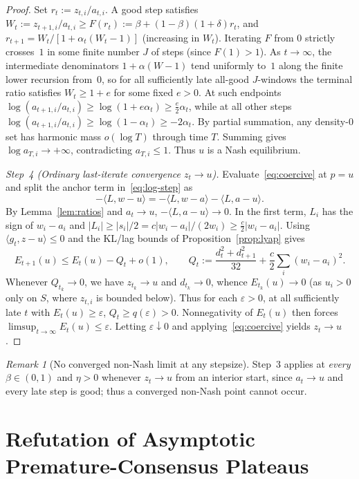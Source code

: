 \documentclass[11pt]{article}
\theoremstyle{plain}
\theoremstyle{definition}
\theoremstyle{remark}
\newtheorem{remark}{Remark}
\begin{document}
\begin{proof}
Set $r_t := z_{t,i}/a_{t,i}$. A good step satisfies $W_t := z_{t+1,i}/a_{t,i} \ge F(r_t) := \beta + (1-\beta)(1+\delta)r_t$, and $r_{t+1} = W_t/[1 + \alpha_t(W_t - 1)]$ (increasing in $W_t$). Iterating $F$ from $0$ strictly crosses~$1$ in some finite number $J$ of steps (since $F(1) > 1$). As $t \to \infty$, the intermediate denominators $1 + \alpha(W-1)$ tend uniformly to~$1$ along the finite lower recursion from~$0$, so for all sufficiently late all-good $J$-windows the terminal ratio satisfies $W_t \ge 1 + e$ for some fixed $e > 0$. At such endpoints $\log(a_{t+1,i}/a_{t,i}) \ge \log(1 + e\alpha_t) \ge \frac{e}{2}\alpha_t$, while at all other steps $\log(a_{t+1,i}/a_{t,i}) \ge \log(1 - \alpha_t) \ge -2\alpha_t$. By partial summation, any density-$0$ set has harmonic mass $o(\log T)$ through time $T$. Summing gives $\log a_{T,i} \to +\infty$, contradicting $a_{T,i} \le 1$. Thus $u$ is a Nash equilibrium.

\emph{Step~4 (Ordinary last-iterate convergence $z_t \to u$).}
Evaluate~\eqref{eq:coercive} at $p = u$ and split the anchor term in~\eqref{eq:log-step} as
\[
-\langle L, w - u \rangle = -\langle L, w - a \rangle - \langle L, a - u \rangle.
\]
By Lemma~\ref{lem:ratios} and $a_t \to u$, $-\langle L, a - u\rangle \to 0$. In the first term, $L_i$ has the sign of $w_i - a_i$ and $|L_i| \ge |s_i|/2 = c|w_i - a_i|/(2w_i) \ge \frac{c}{2}|w_i - a_i|$. Using $\langle g_t, z - u\rangle \le 0$ and the KL/lag bounds of Proposition~\ref{prop:lyap} gives
\[
E_{t+1}(u) \le E_t(u) - Q_t + o(1), \qquad Q_t := \frac{d_t^2 + d_{t+1}^2}{32} + \frac{c}{2}\sum_i (w_i - a_i)^2.
\]
Whenever $Q_{t_k} \to 0$, we have $z_{t_k} \to u$ and $d_{t_k} \to 0$, whence $E_{t_k}(u) \to 0$ (as $u_i > 0$ only on $S$, where $z_{t,i}$ is bounded below). Thus for each $\varepsilon > 0$, at all sufficiently late $t$ with $E_t(u) \ge \varepsilon$, $Q_t \ge q(\varepsilon) > 0$. Nonnegativity of $E_t(u)$ then forces $\limsup_{t \to \infty} E_t(u) \le \varepsilon$. Letting $\varepsilon \downarrow 0$ and applying~\eqref{eq:coercive} yields $z_t \to u$.
\end{proof}

\begin{remark}[No converged non-Nash limit at any stepsize]
Step~3 applies at \emph{every} $\beta \in (0, 1)$ and $\eta > 0$ whenever $z_t \to u$ from an interior start, since $a_t \to u$ and every late step is good; thus a converged non-Nash point cannot occur.
\end{remark}

\section{Refutation of Asymptotic Premature-Consensus Plateaus}
\end{document}
